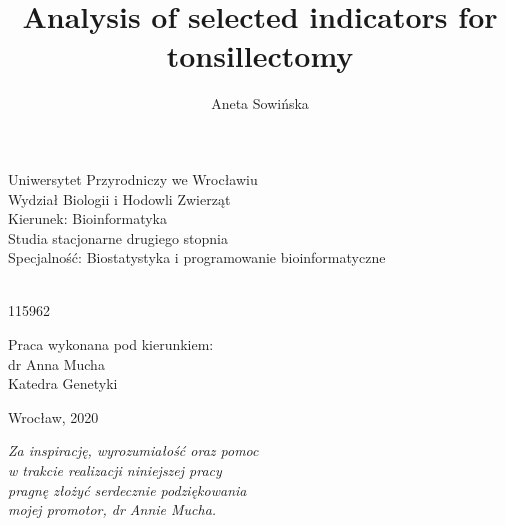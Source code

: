 \documentclass[12pt,a4paper,notitlepage]{report}
\author{Aneta Sowi\'nska}
\title{Analysis of selected indicators for tonsillectomy}
\makeatletter
\renewcommand{\maketitle}{\begin{titlepage}

    \begin{center}
    \LARGE Uniwersytet Przyrodniczy we Wroc\l{}awiu\\
    \Large Wydzia\l{} Biologii i Hodowli Zwierz\k{a}t\\
    \large Kierunek: Bioinformatyka\\
    Studia stacjonarne drugiego stopnia\\
    Specjalno\'s\'c: Biostatystyka i programowanie bioinformatyczne
    \end{center}

    \vspace{3cm}

    \begin{center}
    \huge \@author \\
    \large 115962
    
    \vspace{2cm}
    
     \textbf{\Huge \@title}
     \end{center}

    \vspace{5cm}
    
    \begin{flushright}
     {\large Praca wykonana pod kierunkiem:}\\
         dr Anna Mucha\\
         Katedra Genetyki
     \end{flushright}

    \vspace*{\stretch{6}}

    \begin{center}
    \Large Wroc\l{}aw, 2020
    \end{center}

  \end{titlepage}%
}
\makeatother
\begin{document}

\maketitle



\thispagestyle{empty}
\begin{flushright}
  \null\vfill
  \large
  \itshape
  \rightskip=1cm
  Za inspirację, wyrozumiałość oraz pomoc\\
   w trakcie realizacji niniejszej pracy\\
   pragnę złożyć serdecznie podziękowania\\
   mojej promotor, dr Annie Mucha.\\
  \vspace{1cm}
\end{flushright}



\end{document}

